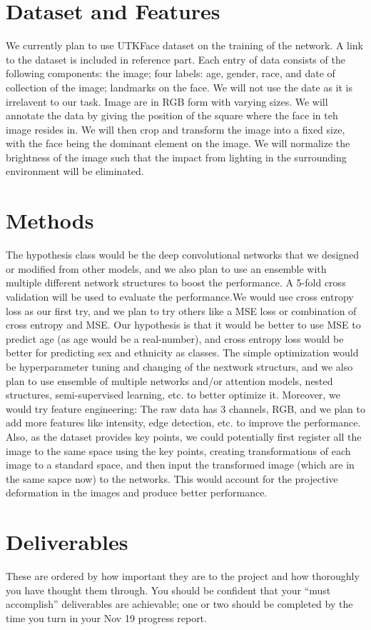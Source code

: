\documentclass{article}
\begin{document}
\section{Dataset and Features}
We currently plan to use UTKFace dataset on the training of the network. A link to the dataset is included in reference part. Each entry of data consists of the following components: the image; four labels: age, gender, race, and date of collection of the image; landmarks on the face. We will not use the date as it is irrelavent to our task. Image are in RGB form with varying sizes. We will annotate the data by giving the position of the square where the face in teh image resides in. We will then crop and transform the image into a fixed size, with the face being the dominant element on the image. We will normalize the brightness of the image such that the impact from lighting in the surrounding environment will be eliminated.

\section{Methods}
The hypothesis class would be the deep convolutional networks that we designed or modified from other models, and we also plan to use an ensemble with multiple different network structures to boost the performance. A 5-fold cross validation will be used to evaluate the performance.We would use cross entropy loss as our first try, and we plan to try others like a MSE loss or combination of cross entropy and MSE. Our hypothesis is that it would be better to use MSE to predict age (as age would be a real-number), and cross entropy loss would be better for predicting sex and ethnicity as classes. The simple optimization would be hyperparameter tuning and changing of the nextwork structurs, and we also plan to use ensemble of multiple networks and/or attention models, nested structures, semi-supervised learning, etc. to better optimize it. Moreover, we would try feature engineering: The raw data has 3 channels, RGB, and we plan to add more features like intensity, edge detection, etc. to improve the performance. Also, as the dataset provides key points, we could potentially first register all the image to the same space using the key points, creating transformations of each image to a standard space, and then input the transformed image (which are in the same sapce now) to the networks. This would account for the projective deformation in the images and produce better performance. 

\section{Deliverables}
These are ordered by how important they are to the project and how thoroughly you have thought them through. You should be confident that your ``must accomplish'' deliverables are achievable; one or two should be completed by the time you turn in your Nov 19 progress report.
\end{document}
